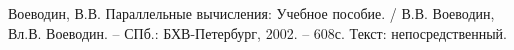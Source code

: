 \begin{thebibliography}{}
	 Воеводин, В.В. Параллельные вычисления: Учебное пособие. / В.В. Воеводин, Вл.В. Воеводин. -- СПб.: БХВ-Петербург, 2002. -- 608с. Текст: непосредственный.
\end{thebibliography}
